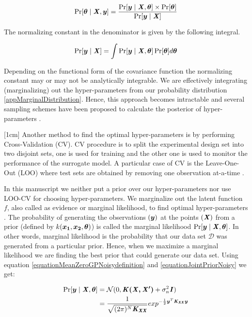 \begin{equation}
    \Pr[\boldsymbol{\theta} \mid \bm{\mathit{X}}, \boldsymbol{y}] = \frac{\Pr[\boldsymbol{y} \mid \bm{\mathit{X}}, \boldsymbol{\theta}] \times \Pr[\boldsymbol{\theta}]}{\Pr[\boldsymbol{y} \mid \bm{\mathit{X}}]}
\end{equation}

The normalizing constant in the denominator is given by the following integral.

\begin{equation}
    \Pr[\boldsymbol{y} \mid \bm{\mathit{X}}] = \int \Pr[\boldsymbol{y} \mid \bm{\mathit{X}}, \boldsymbol{\theta}]\Pr[\boldsymbol{\theta}]d\boldsymbol{\theta}
\end{equation}

Depending on the functional form of the covariance function the normalizing constant may or may not be analytically integrable. We are effectively integrating (marginalizing) out the hyper-parameters from our probability distribution \ref{appMarginalDistribution}. Hence, this approach becomes intractable and several sampling schemes have been proposed to calculate the posterior of hyper-parameters \cite{osborne2010bayesian, neal2011mcmc}.

[1cm]
Another method to find the optimal hyper-parameters is by performing Cross-Validation (CV). CV procedure is to split the experimental design set into two disjoint sets, one is used for training and the other one is used to monitor the performance of the surrogate model. A particular case of CV is the Leave-One-Out (LOO) where test sets are obtained by removing one observation at-a-time \cite{Rasmussen2005, dubrule1983cross, le2013multi}. 

In this manuscript we neither put a prior over our hyper-parameters nor use LOO-CV for choosing hyper-parameters. We marginalize out the latent function $f$, also called as evidence or marginal likelihood, to find optimal hyper-parameters \cite{mackay2003information}. The probability of generating the observations $(\boldsymbol{y})$ at the points $(\bm{\mathit{X}})$ from a prior (defined by $k(\boldsymbol{x_1}, \boldsymbol{x_2}, \boldsymbol{\theta})$) is called the marginal likelihood $\Pr[\boldsymbol{y} \mid \bm{\mathit{X}}, \boldsymbol{\theta}]$. In other words, marginal likelihood is the probability that our data set $\mathcal{D}$ was generated from a particular prior. Hence, when we maximize a marginal likelihood we are finding the best prior that could generate our data set. Using equation \ref{equationMeanZeroGPNoisydefinition} and \ref{equationJointPriorNoisy} we get:

\begin{equation}\label{equationMarginalLikelihood}
\begin{aligned}
\Pr[\boldsymbol{y} \mid \bm{\mathit{X}}, \boldsymbol{\theta}] & = \mathcal{N}(0 , \bm{\mathit{K(X, X')}} + \sigma^{2}_{n}\bm{\mathit{I}})  \\
& = \frac{1}{\sqrt{(2\pi)^{N} \bm{\mathit{K_{XX}}}}} exp^{-\frac{1}{2}\boldsymbol{y}^{T}\bm{\mathit{K_{XX}}}\boldsymbol{y}}
\end{aligned}
\end{equation}

